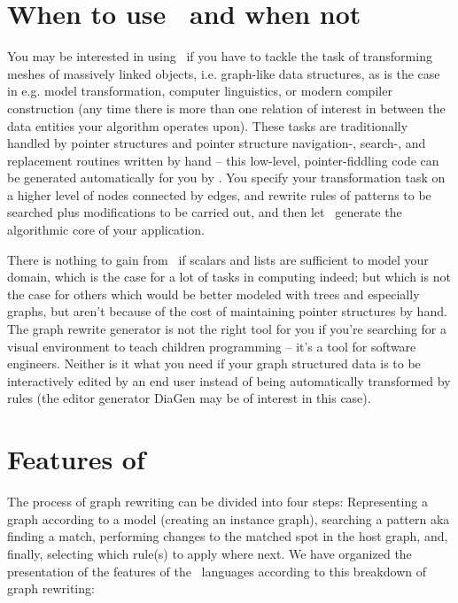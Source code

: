 \section{When to use \GrG~and when not}
You may be interested in using \GrG\ if you have to tackle the task of transforming meshes of massively linked objects, i.e. graph-like data structures,
as is the case in e.g. model transformation, computer linguistics, or modern compiler construction
(any time there is more than one relation of interest in between the data entities your algorithm operates upon).
These tasks are traditionally handled by pointer structures and pointer structure navigation-, search-, and replacement routines written by hand
-- this low-level, pointer-fiddling code can be generated automatically for you by \GrG.
You specify your transformation task on a higher level of nodes connected by edges, and rewrite rules of patterns to be searched plus modifications to be carried out,
and then let \GrG\ generate the algorithmic core of your application.

There is nothing to gain from \GrG\ if scalars and lists are sufficient to model your domain,
which is the case for a lot of tasks in computing indeed;
but which is not the case for others which would be better modeled with trees and especially graphs,
but aren't because of the cost of maintaining pointer structures by hand.
The graph rewrite generator is not the right tool for you if you're searching for a visual environment to teach children programming -- it's a tool for software engineers.
Neither is it what you need if your graph structured data is to be interactively edited by an end user instead of being automatically transformed by rules (the editor generator DiaGen\cite{diagen} may be of interest in this case).


\section{Features of \GrG}

The process of graph rewriting can be divided into four steps:
Representing a graph according to a model (creating an instance graph),
searching a pattern aka finding a match,
performing changes to the matched spot in the host graph,
and, finally, selecting which rule(s) to apply where next.
We have organized the presentation of the features of the \GrG\ languages according to this breakdown of graph rewriting:

